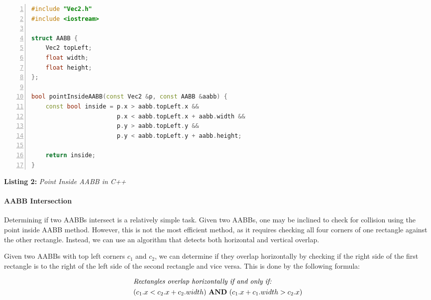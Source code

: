 \documentclass[10pt,a4paper]{article}
\renewcommand{\land}{\,\,\textrm{\textbf{AND}}\,\,}
\begin{document}
\begin{mdframed}
    \vspace{1em}

    \begin{lstlisting}[language=C++, aboveskip=3mm,
        belowskip=3mm,
        showstringspaces=false,
        columns=flexible,
        basicstyle={\small\ttfamily},
        numbers=left,
        numberstyle=\tiny\color{gray},
        keywordstyle=\color{blue},
        commentstyle=\color{dkgreen},
        stringstyle=\color{mauve},
        breaklines=true,
        breakatwhitespace=true,
        tabsize=3,
        xleftmargin=1em]
#include "Vec2.h"
#include <iostream>

struct AABB {
    Vec2 topLeft;
    float width;
    float height;
};

bool pointInsideAABB(const Vec2 &p, const AABB &aabb) {
    const bool inside = p.x > aabb.topLeft.x &&
                        p.x < aabb.topLeft.x + aabb.width &&
                        p.y > aabb.topLeft.y &&
                        p.y < aabb.topLeft.y + aabb.height;

    return inside;
}
\end{lstlisting}

\end{mdframed}
\begin{center}
    \textbf{Listing 2:} \textit{Point Inside AABB in C++}
\end{center}

\newpage
\paragraph*{AABB Intersection}

Determining if two AABBs intersect is a relatively simple task. Given two
AABBs, one may be inclined to check for collision using the point inside AABB
method. However, this is not the most efficient method, as it requires checking
all four corners of one rectangle against the other rectangle. Instead, we can
use an algorithm that detects both horizontal and vertical overlap.

Given two AABBs with top left corners $c_1$ and $c_2$, we can determine if they
overlap horizontally by checking if the right side of the first rectangle is to
the right of the left side of the second rectangle and vice versa. This is done
by the following formula:

\begin{equation}
    \begin{aligned}
         & \textit{Rectangles overlap horizontally if and only if:}      \\
         & (c_1.x < c_2.x + c_2.width) \land (c_1.x + c_1.width > c_2.x)
    \end{aligned}
\end{equation}
\end{document}
